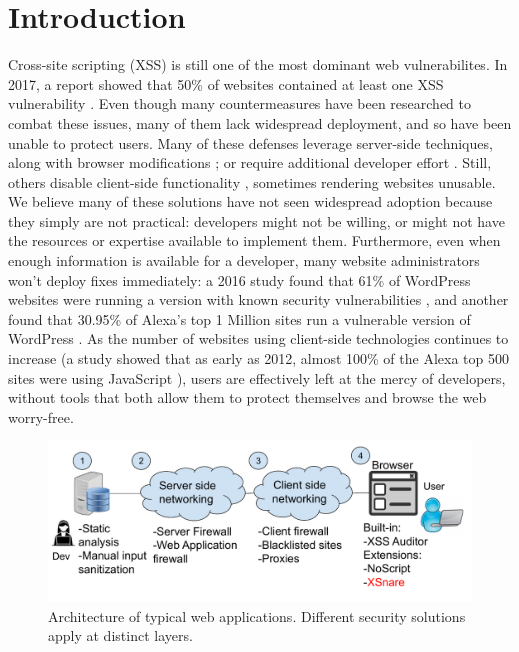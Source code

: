 \section{Introduction} \label{introduction}

Cross-site scripting (XSS) is still one of the most dominant web vulnerabilites. In 2017, a report showed that 50\% of websites contained at least one XSS vulnerability \cite{Acunetix}. Even though many countermeasures have been researched to combat these issues, many of them lack widespread deployment, and so have been unable to protect users. Many of these defenses leverage server-side techniques, along with browser modifications \cite{Jim:2007:DSI:1242572.1242654,Nadji:2009,Wurzinger:2009:SMX:1656360.1656379,10.1007/978-3-642-31540-4_17}; or require additional developer effort \cite{10.1007/978-3-319-66399-9_7}. Still, others disable client-side functionality \cite{Noscript,Snyder:2017:MWD:3133956.3133966}, sometimes rendering websites unusable. We believe many of these solutions have not seen widespread adoption because they simply are not practical: developers might not be willing, or might not have the resources or expertise available to implement them. Furthermore, even when enough information is available for a developer, many website administrators won't deploy fixes immediately: a 2016 study found that 61\% of WordPress websites were running a version with known security vulnerabilities \cite{Sucuri}, and another found that 30.95\% of Alexa's top 1 Million sites run a vulnerable version of WordPress \cite{wpwhitesecurity}. As the number of websites using client-side technologies continues to increase (a study showed that as early as 2012, almost 100\% of the Alexa top 500 sites were using JavaScript \cite{Stock:2017:WTI:3241189.3241265}), users are effectively left at the mercy of developers, without tools that both allow them to protect themselves and browse the web worry-free.

 
 \begin{figure}[h]
 	\includegraphics[scale=0.37]{img/web_app_architecture_one.pdf}
 	\caption{Architecture of typical web applications. Different security solutions apply at distinct layers.}
 	\label{fig:web_architecture}
 \end{figure}
 
